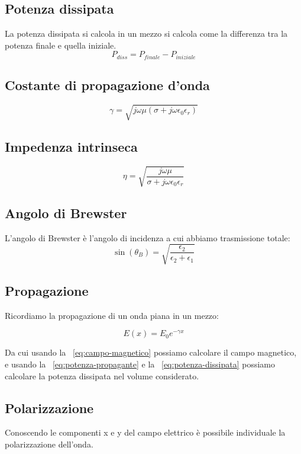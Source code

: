 \documentclass[10pt,a4paper]{report}
\begin{document}
	\subsection{Potenza dissipata}

		La potenza dissipata si calcola in un mezzo si calcola come la differenza tra la potenza finale e quella iniziale.
		\begin{equation}
			P_{diss}=P_{finale}-P_{iniziale}
			\label{eq:potenza-dissipata}
		\end{equation}
	
	\subsection{Costante di propagazione d'onda}
		\[
		\gamma=\sqrt{j\omega\mu(\sigma+j\omega\epsilon_0\epsilon_r)}
		\]
	\subsection{Impedenza intrinseca}
		\[
		\eta=\sqrt{\frac{j\omega\mu}{\sigma+j\omega\epsilon_0\epsilon_r}}
		\]
		

	\subsection{Angolo di Brewster}

	L'angolo di Brewster è l'angolo di incidenza a cui abbiamo trasmissione totale:
	\[
	\sin(\theta_B)=\sqrt{\frac{\epsilon_2}{\epsilon_2+\epsilon_1}}
	\]




	\subsection{Propagazione}
	Ricordiamo la propagazione di un onda piana in un mezzo:
	

	\[
	E(x)=E_0e^{-\gamma x}
	\]
	
	Da cui usando la ~\ref{eq:campo-magnetico} possiamo calcolare il campo magnetico, e usando la ~\ref{eq:potenza-propagante} e la ~\ref{eq:potenza-dissipata} possiamo calcolare la potenza dissipata nel volume considerato.


	\subsection{Polarizzazione}

	Conoscendo le componenti x e y del campo elettrico è possibile individuale la polarizzazione dell'onda.
\end{document}

